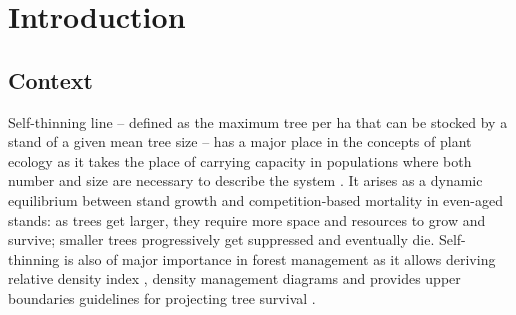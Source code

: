 \documentclass[12pt,english]{article}
\begin{document}
\newpage
\section{Introduction}
\subsection{Context}
Self-thinning line -- defined as the maximum tree per ha that can be stocked by a stand of a given mean tree size -- has a major place in the concepts of plant ecology as it takes the place of carrying capacity in populations where both number and size are necessary to describe the system \citep{Westoby1981, Westoby1984}. It arises as a dynamic equilibrium between stand growth and competition-based mortality in even-aged stands: as trees get larger, they require more space and resources to grow and survive; smaller trees progressively get suppressed and eventually die. Self-thinning is also of major importance in forest management as it allows deriving relative density index \citep{Reineke1933}, density management diagrams \citep{JackLong1996,LongVacchiano2014} and provides upper boundaries guidelines for projecting tree survival \citep{MonserudLedermannSterba2004,LeMoguedecDhote2012,LandsbergWaring1997}.%

\medskip
\end{document}
